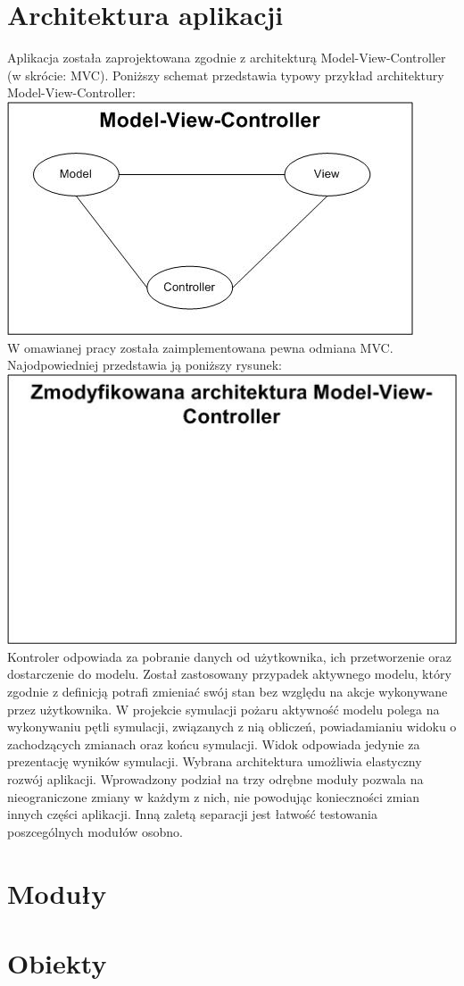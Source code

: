 \section {Architektura aplikacji}
Aplikacja została zaprojektowana zgodnie z architekturą Model-View-Controller (w skrócie: MVC).
Poniższy schemat przedstawia typowy przykład architektury Model-View-Controller:\\
\includegraphics{MVC.jpg} \\
W omawianej pracy została zaimplementowana pewna odmiana MVC.
Najodpowiedniej przedstawia ją poniższy rysunek:\\
\includegraphics{modifiedMVC.jpg}\\
Kontroler odpowiada za pobranie danych od użytkownika, ich przetworzenie oraz dostarczenie do modelu.
Został zastosowany przypadek aktywnego modelu, który zgodnie z definicją potrafi zmieniać swój stan 
bez względu na akcje wykonywane przez użytkownika. W projekcie symulacji pożaru aktywność modelu polega na 
wykonywaniu pętli symulacji, związanych z nią obliczeń, powiadamianiu widoku o zachodzących zmianach oraz
końcu symulacji. Widok odpowiada jedynie za prezentację wyników symulacji.
Wybrana architektura umożliwia elastyczny rozwój aplikacji. Wprowadzony podział na trzy odrębne moduły pozwala
na nieograniczone zmiany w każdym z nich, nie powodując konieczności zmian innych części aplikacji.
Inną zaletą separacji jest łatwość testowania poszcególnych modułów osobno. 
\section {Moduły}
\section {Obiekty}
